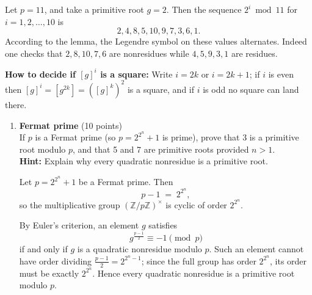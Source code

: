 \begin{example}
Let $p=11$, and take a primitive root $g=2$.  Then the sequence $2^i\bmod11$ for $i=1,2,\dots,10$ is
$$2,4,8,5,10,9,7,3,6,1.$$
According to the lemma, the Legendre symbol on these values alternates. Indeed one checks that $2,8,10,7,6$ are nonresidues while $4,5,9,3,1$ are residues.
\end{example}

\bigskip

\noindent\textbf{How to decide if $[g]^i$ is a square:}  Write $i=2k$ or $i=2k+1$; if $i$ is even then $[g]^i=[g^{2k}]=([g]^k)^2$ is a square, and if $i$ is odd no square can land there.

\newpage




\begin{enumerate}
  \section{Quick Notes}
  











  \section{Final}

  
  \item \textbf{Fermat prime} (10 points)\\
  If $p$ is a Fermat prime (so $p=2^{2^n}+1$ is prime), prove that 3 is a primitive root modulo $p$, and that 5 and 7 are primitive roots provided $n>1$.\\
  \textbf{Hint:} Explain why every quadratic nonresidue is a primitive root.
  \begin{subanswer}
  Let \(p=2^{2^n}+1\) be a Fermat prime.  Then
  \[
  p-1 \;=\; 2^{2^n},
  \]
  so the multiplicative group \((\mathbb{Z}/p\mathbb{Z})^\times\) is cyclic of order \(2^{2^n}\).

  By Euler’s criterion, an element \(g\) satisfies
  \[
  g^{\frac{p-1}{2}}\equiv -1\pmod p
  \]
  if and only if \(g\) is a quadratic nonresidue modulo \(p\).  Such an element cannot have order dividing \(\tfrac{p-1}{2}=2^{2^n-1}\); since the full group has order \(2^{2^n}\), its order must be exactly \(2^{2^n}\).  Hence every quadratic nonresidue is a primitive root modulo \(p\).


\end{subanswer}
\end{enumerate}
